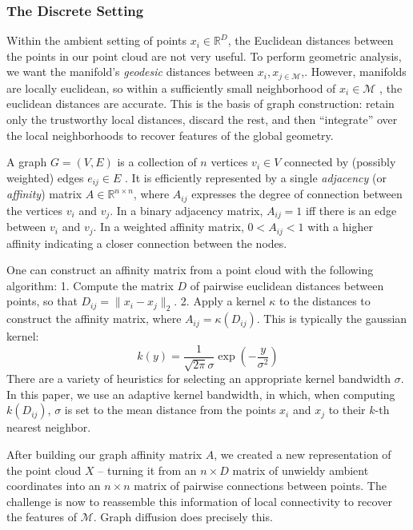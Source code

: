 \documentclass[
  letterpaper,
  DIV=11,
  numbers=noendperiod]{scrartcl}
\begin{document}
\subsubsection{The Discrete Setting}\label{the-discrete-setting}

Within the ambient setting of points \(x_{i} \in \mathbb{R}^D\), the
Euclidean distances between the points in our point cloud are not very
useful. To perform geometric analysis, we want the manifold's
\emph{geodesic} distances between \(x_{i}, x_{j \in \mathcal{M}}\),.
However, manifolds are locally euclidean, so within a sufficiently small
neighborhood of \(x_{i} \in \mathcal{M}\) , the euclidean distances are
accurate. This is the basis of graph construction: retain only the
trustworthy local distances, discard the rest, and then ``integrate''
over the local neighborhoods to recover features of the global geometry.

A graph \(G = (V, E)\) is a collection of \(n\) vertices \(v_{i} \in V\)
connected by (possibly weighted) edges \(e_{ij} \in E\) . It is
efficiently represented by a single \emph{adjacency} (or
\emph{affinity}) matrix \(A \in \mathbb{R}^{n \times n}\), where
\(A_{ij}\) expresses the degree of connection between the vertices
\(v_{i}\) and \(v_{j}\). In a binary adjacency matrix, \(A_{ij}=1\) iff
there is an edge between \(v_{i}\) and \(v_{j}\). In a weighted affinity
matrix, \(0<A_{ij}<1\) with a higher affinity indicating a closer
connection between the nodes.

One can construct an affinity matrix from a point cloud with the
following algorithm: 1. Compute the matrix \(D\) of pairwise euclidean
distances between points, so that \(D_{ij}=\|x_{i}-x_{j}\|_{2}\). 2.
Apply a kernel \(\kappa\) to the distances to construct the affinity
matrix, where \(A_{ij} = \kappa(D_{ij})\). This is typically the
gaussian kernel: \[
k(y) = \frac{1}{\sqrt{ 2\pi }\sigma}\exp\left( -\frac{y}{\sigma^2} \right)
\] There are a variety of heuristics for selecting an appropriate kernel
bandwidth \(\sigma\). In this paper, we use an adaptive kernel
bandwidth, in which, when computing \(k(D_{ij})\), \(\sigma\) is set to
the mean distance from the points \(x_{i}\) and \(x_{j}\) to their
\(k\)-th nearest neighbor.

After building our graph affinity matrix \(A\), we created a new
representation of the point cloud \(X\) -- turning it from an
\(n \times D\) matrix of unwieldy ambient coordinates into an
\(n \times n\) matrix of pairwise connections between points. The
challenge is now to reassemble this information of local connectivity to
recover the features of \(\mathcal{M}\). Graph diffusion does precisely
this.
\end{document}
